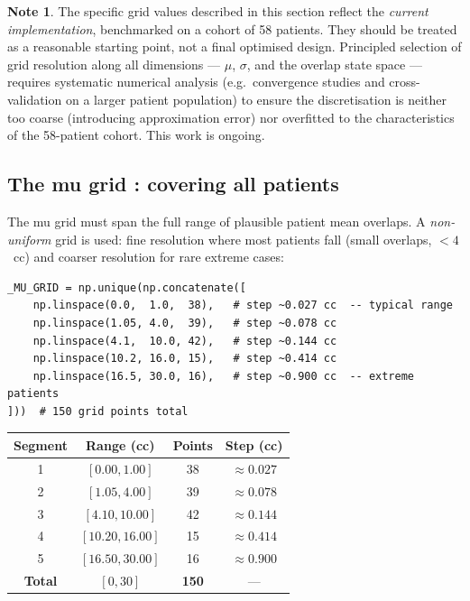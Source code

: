 \documentclass[11pt]{article}
\DeclareRobustCommand{\code}[1]{\ifmmode\text{\texttt{\detokenize{#1}}}\else\texttt{\detokenize{#1}}\fi}
\theoremstyle{definition}
\newtheorem{note}{Note}[section]
\begin{document}
\begin{note}
The specific grid values described in this section reflect the
\emph{current implementation}, benchmarked on a cohort of 58 patients.
They should be treated as a reasonable starting point, not a final
optimised design.  Principled selection of grid resolution along all
dimensions --- $\mu$, $\sigma$, and the overlap state space --- requires
systematic numerical analysis (e.g.\ convergence studies and
cross-validation on a larger patient population) to ensure the
discretisation is neither too coarse (introducing approximation error)
nor overfitted to the characteristics of the 58-patient cohort.  This
work is ongoing.
\end{note}

\subsection{The mu grid \code{_MU_GRID}: covering all patients}

The mu grid must span the full range of plausible patient mean overlaps.  A
\emph{non-uniform} grid is used: fine resolution where most patients fall
(small overlaps, $< 4$~cc) and coarser resolution for rare extreme cases:

\begin{verbatim}
_MU_GRID = np.unique(np.concatenate([
    np.linspace(0.0,  1.0,  38),   # step ~0.027 cc  -- typical range
    np.linspace(1.05, 4.0,  39),   # step ~0.078 cc
    np.linspace(4.1,  10.0, 42),   # step ~0.144 cc
    np.linspace(10.2, 16.0, 15),   # step ~0.414 cc
    np.linspace(16.5, 30.0, 16),   # step ~0.900 cc  -- extreme patients
]))  # 150 grid points total
\end{verbatim}

\begin{center}
\begin{tabular}{|c|c|c|c|}
\hline
\textbf{Segment} & \textbf{Range (cc)} & \textbf{Points} & \textbf{Step (cc)} \\
\hline
1 & $[0.00, 1.00]$   & 38 & $\approx 0.027$ \\
2 & $[1.05, 4.00]$   & 39 & $\approx 0.078$ \\
3 & $[4.10, 10.00]$  & 42 & $\approx 0.144$ \\
4 & $[10.20, 16.00]$ & 15 & $\approx 0.414$ \\
5 & $[16.50, 30.00]$ & 16 & $\approx 0.900$ \\
\hline
\textbf{Total} & $[0, 30]$ & \textbf{150} & --- \\
\hline
\end{tabular}
\end{center}
\end{document}
